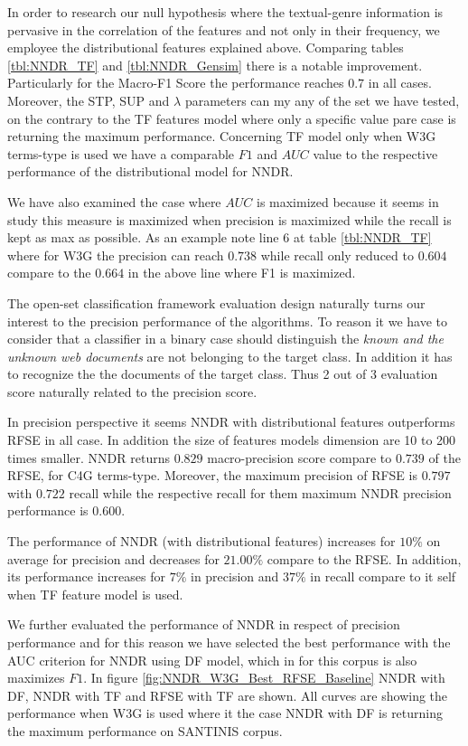 \documentclass[runningheads]{llncs}
\begin{document}
In order to research our null hypothesis where the textual-genre information is pervasive in the correlation of the features and not only in their frequency, we employee the distributional features explained above. Comparing tables \ref{tbl:NNDR_TF} and \ref{tbl:NNDR_Gensim} there is a notable improvement. Particularly for the Macro-F1 Score the performance reaches $0.7$ in all cases. Moreover, the STP, SUP and $\lambda$ parameters can my any of the set we have tested, on the contrary to the TF features model where only a specific value pare case is returning the maximum performance. Concerning TF model only when W3G terms-type is used we have a comparable $F1$ and $AUC$ value to the respective performance of the distributional model for NNDR.

We have also examined the case where $AUC$ is maximized because it seems in \cite{pritsos2018open} study this measure is maximized when precision is maximized while the recall is kept as max as possible. As an example note line 6 at table \ref{tbl:NNDR_TF} where for W3G the precision can reach $0.738$ while recall only reduced to $0.604$ compare to the $0.664$ in the above line where F1 is maximized.

The open-set classification framework evaluation design naturally turns our interest to the precision performance of the algorithms. To reason it we have to consider that a classifier in a binary case should distinguish the \textit{known and the unknown web documents} are not belonging to the target class. In addition it has to recognize the the documents of the target class. Thus 2 out of 3 evaluation score naturally related to the precision score.

In precision perspective it seems NNDR with distributional features outperforms RFSE in all case. In addition the size of features models dimension are 10 to 200 times smaller. NNDR returns $0.829$ macro-precision score compare to $0.739$ of the RFSE, for C4G terms-type. Moreover, the maximum precision of RFSE is $0.797$ with $0.722$ recall while the respective recall for them maximum NNDR precision performance is $0.600$.

The performance of NNDR (with distributional features) increases for $10\%$ on average for precision and decreases for $21.00\%$ compare to the RFSE. In addition, its performance increases for $7\%$ in precision and $37\%$ in recall compare to it self when TF feature model is used.

We further evaluated the performance of NNDR in respect of precision performance and for this reason we have selected the best performance with the AUC criterion for NNDR using DF model, which in for this corpus is also maximizes $F1$. In figure \ref{fig:NNDR_W3G_Best_RFSE_Baseline} NNDR with DF, NNDR with TF and RFSE with TF are shown. All curves are showing the performance when W3G is used where it the case NNDR with DF is returning the maximum performance on SANTINIS corpus.
\end{document}
